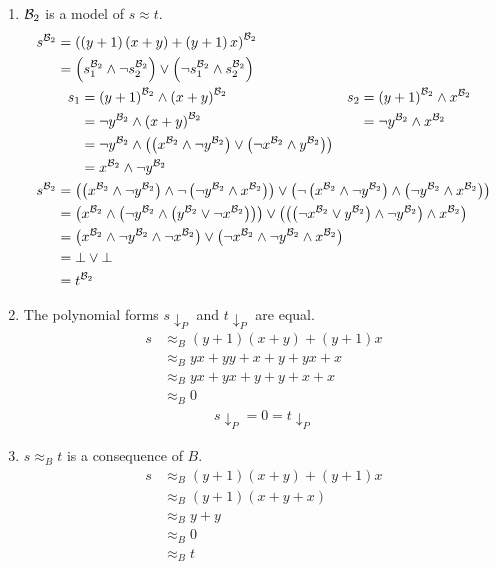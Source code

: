 	\begin{enumerate}
			\item ${\mathcal{B}_2}$ is a model of $s\approx t$.
			\begin{align*}
				s^{\mathcal{B}_2} & =\left( \left( y+1\right)\left( x+y\right)+\left( y+1\right)x\right)^{\mathcal{B}_2}       \\
				& =\left( s_1^{\mathcal{B}_2}\wedge \neg s_2^{\mathcal{B}_2}\right)\vee\left( \neg s_1^{\mathcal{B}_2}\wedge s_2^{\mathcal{B}_2}\right) \\
				&\hspace{8pt}\begin{aligned}
				s_1 & =\left( y+1\right)^{\mathcal{B}_2}\wedge\left( x+y\right)^{\mathcal{B}_2} & s_2 & =   \left( y+1\right)^{\mathcal{B}_2}\wedge x^{\mathcal{B}_2} \\
				    & =\neg y^{\mathcal{B}_2}\wedge\left( x+y\right)^{\mathcal{B}_2}            &     & = \neg y^{\mathcal{B}_2}\wedge x^{\mathcal{B}_2}              \\
				&=\neg y^{\mathcal{B}_2}\wedge\left( \left( x^{\mathcal{B}_2}\wedge\neg y^{\mathcal{B}_2}\right)\vee\left( \neg x^{\mathcal{B}_2}\wedge y^{\mathcal{B}_2}\right)\right)\\
				& = x^{\mathcal{B}_2}\wedge\neg y^{\mathcal{B}_2}
				\end{aligned}\\
				s^{\mathcal{B}_2} & =\left( \left( x^{\mathcal{B}_2}\wedge\neg y^{\mathcal{B}_2}\right)\wedge \neg \left( \neg y^{\mathcal{B}_2}\wedge x^{\mathcal{B}_2}\right)\right)\vee\left( \neg\left( x^{\mathcal{B}_2}\wedge\neg y^{\mathcal{B}_2}\right)\wedge \left( \neg y^{\mathcal{B}_2}\wedge x^{\mathcal{B}_2}\right)\right) \\
				& =\left( x^{\mathcal{B}_2}\wedge\left( \neg y^{\mathcal{B}_2}\wedge \left( y^{\mathcal{B}_2}\vee\neg x^{\mathcal{B}_2}\right)\right)\right)\vee\left( \left( \left( \neg x^{\mathcal{B}_2}\vee y^{\mathcal{B}_2}\right)\wedge \neg y^{\mathcal{B}_2}\right)\wedge x^{\mathcal{B}_2}\right)              \\
				& =\left( x^{\mathcal{B}_2}\wedge\neg y^{\mathcal{B}_2}\wedge \neg x^{\mathcal{B}_2}\right)\vee\left( \neg x^{\mathcal{B}_2}\wedge \neg y^{\mathcal{B}_2}\wedge x^{\mathcal{B}_2}\right)                                                                                             \\
				& =\bot\vee\bot\\
				& =t^{\mathcal{B}_2} 
			\end{align*}
			\item The polynomial forms $s{\downarrow_P}$ and $t{\downarrow_P}$ are equal.
			\begin{align*}
				s & \approx_B (y+1)(x+y)+(y+1)x \\
				  & \approx_B yx+yy+x+y+yx+x    \\
				  & \approx_B yx+yx+y+y+x+x     \\
				  & \approx_B 0
			\end{align*}
			\begin{align*}
				s{\downarrow_P}=0=t{\downarrow_P}
			\end{align*}
			\item $s\approx_B t$ is a consequence of $B$.
			\begin{align*}
				s & \approx_B (y+1)(x+y)+(y+1)x \\
				  & \approx_B (y+1)(x+y+x)      \\
				  & \approx_B y+y               \\
				  & \approx_B 0                 \\
				  & \approx_B t                 
			\end{align*}
		\end{enumerate}
